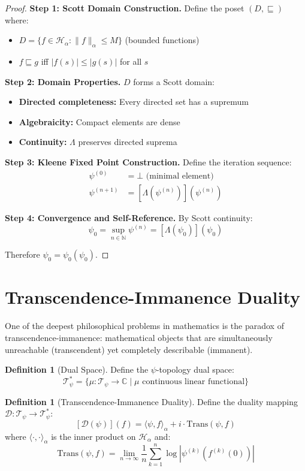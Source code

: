 \documentclass[12pt]{article}
\theoremstyle{plain}
\theoremstyle{definition}
\newtheorem{definition}[theorem]{Definition}
\begin{document}
\begin{proof}
\textbf{Step 1: Scott Domain Construction.}
Define the poset $(D, \sqsubseteq)$ where:
\begin{itemize}
\item $D = \{f \in \mathcal{H}_\alpha : \|f\|_\alpha \leq M\}$ (bounded functions)
\item $f \sqsubseteq g$ iff $|f(s)| \leq |g(s)|$ for all $s$
\end{itemize}

\textbf{Step 2: Domain Properties.}
$D$ forms a Scott domain:
\begin{itemize}
\item \textbf{Directed completeness:} Every directed set has a supremum
\item \textbf{Algebraicity:} Compact elements are dense
\item \textbf{Continuity:} $\Lambda$ preserves directed suprema
\end{itemize}

\textbf{Step 3: Kleene Fixed Point Construction.}
Define the iteration sequence:
\begin{align}
\psi^{(0)} &= \bot \text{ (minimal element)}\\
\psi^{(n+1)} &= [\Lambda(\psi^{(n)})](\psi^{(n)})
\end{align}

\textbf{Step 4: Convergence and Self-Reference.}
By Scott continuity:
$$\psi_0 = \sup_{n \in \mathbb{N}} \psi^{(n)} = [\Lambda(\psi_0)](\psi_0)$$

Therefore $\psi_0 = \psi_0(\psi_0)$.
\end{proof}

\section{Transcendence-Immanence Duality}

One of the deepest philosophical problems in mathematics is the paradox of transcendence-immanence: mathematical objects that are simultaneously unreachable (transcendent) yet completely describable (immanent).

\begin{definition}[Dual Space]
Define the $\psi$-topology dual space:
$$\mathcal{T}_\psi^* = \{\mu: \mathcal{T}_\psi \to \mathbb{C} \mid \mu \text{ continuous linear functional}\}$$
\end{definition}

\begin{definition}[Transcendence-Immanence Duality]
Define the duality mapping $\mathcal{D}: \mathcal{T}_\psi \to \mathcal{T}_\psi^*$:
$$[\mathcal{D}(\psi)](f) = \langle \psi, f \rangle_\alpha + i \cdot \text{Trans}(\psi, f)$$
where $\langle \cdot, \cdot \rangle_\alpha$ is the inner product on $\mathcal{H}_\alpha$ and:
$$\text{Trans}(\psi, f) = \lim_{n \to \infty} \frac{1}{n} \sum_{k=1}^n \log |\psi^{(k)}(f^{(k)}(0))|$$
\end{definition}
\end{document}
